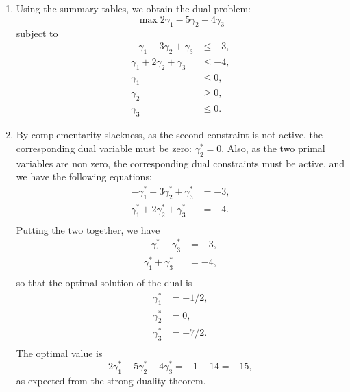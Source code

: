 \begin{enumerate}
\item Using the summary tables, we obtain the dual problem:
\[
\max 2\gamma_1-5\gamma_2+4\gamma_3
\]
subject to 
\begin{align*}
-\gamma_1-3\gamma_2+\gamma_3 & \leq -3,\\
\gamma_1+2\gamma_2+\gamma_3 & \leq -4,\\
\gamma_1 & \leq 0,\\
\gamma_2 & \geq 0,\\
\gamma_3 & \leq 0.
\end{align*}

\item By complementarity slackness, as the second constraint is not active, the corresponding
dual variable must be zero: $\gamma^*_2=0$.
Also, as the two primal variables are non zero, the
  corresponding dual constraints must be active, and we have the following
  equations:
\begin{align*}
-\gamma^*_1-3\gamma^*_2+\gamma^*_3 & = -3,\\
\gamma^*_1+2\gamma^*_2+\gamma^*_3 & = -4.\\
\end{align*}
Putting the two together, we have
\begin{align*}
-\gamma^*_1+\gamma^*_3 & = -3,\\
\gamma^*_1+\gamma^*_3 & = -4,\\
\end{align*}
so that the optimal solution of the dual is
\begin{align*}
  \gamma_1^* &= -1/2, \\
  \gamma_2^* &= 0, \\
  \gamma_3^* &= -7/2. \\
\end{align*}
The optimal value is
\[
2\gamma^*_1-5\gamma^*_2+4\gamma^*_3 = -1-14= -15,
\]
 as expected from the strong duality theorem.

\end{enumerate}

